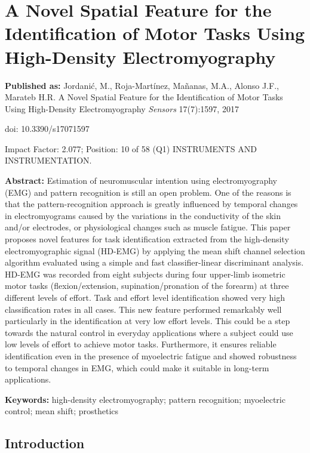 \chapter[A Novel feature for task identification]{A Novel Spatial Feature for the Identification of Motor Tasks Using High-Density Electromyography}
\label{ch:p3}
\textbf{Published as:} 
Jordanić, M., Roja-Martínez,  Ma\~nanas, M.A., Alonso J.F., Marateb H.R.
A Novel Spatial Feature for the Identification of Motor Tasks Using High-Density Electromyography 
\textit{Sensors} 17(7):1597, 2017

doi: 10.3390/s17071597

Impact Factor: 2.077; Position: 10 of 58 (Q1) INSTRUMENTS AND INSTRUMENTATION.


\textbf{Abstract:} Estimation of neuromuscular intention using electromyography (EMG) and pattern recognition is still an open problem. One of the reasons is that the pattern-recognition approach is greatly influenced by temporal changes in electromyograms caused by the variations in the conductivity of the skin and/or electrodes, or physiological changes such as muscle fatigue. This paper proposes novel features for task identification extracted from the high-density electromyographic signal (HD-EMG) by applying the mean shift channel selection algorithm evaluated using a simple and fast classifier-linear discriminant analysis. HD-EMG was recorded from eight subjects during four upper-limb isometric motor tasks (flexion/extension, supination/pronation of the forearm) at three different levels of effort. Task and effort level identification showed very high classification rates in all cases. This new feature performed remarkably well particularly in the identification at very low effort levels. This could be a step towards the natural control in everyday applications where a subject could use low levels of effort to achieve motor tasks. Furthermore, it ensures reliable identification even in the presence of myoelectric fatigue and showed robustness to temporal changes in EMG, which could make it suitable in long-term applications.

\textbf{Keywords:}  high-density electromyography; pattern recognition; myoelectric control; mean shift; prosthetics

\section{Introduction}

